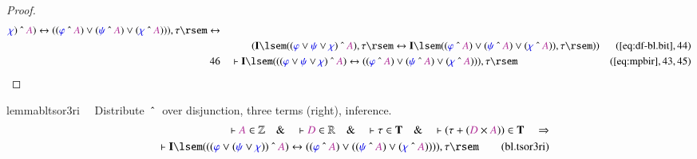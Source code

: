 \begin{proof}
\begin{align}
      \mw{\chi} ) ~\string^~ \mc{A} ) \leftrightarrow ( (
      \mw{\varphi} ~\string^~ \mc{A} ) \vee ( \mw{\psi}
      ~\string^~ \mc{A} ) \vee ( \mw{\chi} ~\string^~
      \mc{A} ) ) ) , \tau \rsem \leftrightarrow \notag \\ & & & \qquad
      (
      \mathbf{I} \lsem ( ( \mw{\varphi} \vee \mw{\psi} \vee
      \mw{\chi} ) ~\string^~ \mc{A} ) , \tau \rsem
      \leftrightarrow \mathbf{I} \lsem ( ( \mw{\varphi}
      ~\string^~ \mc{A} ) \vee ( \mw{\psi} ~\string^~
      \mc{A} ) \vee ( \mw{\chi} ~\string^~ \mc{A} ) ) ,
      \tau \rsem ) )&(\mbox{\ref{eq:df-bl.bit}},44)\notag
  \\ 46 &&  & \vdash \mathbf{I} \lsem ( ( ( \mw{\varphi} \vee \mw{\psi} \vee
      \mw{\chi} ) ~\string^~ \mc{A} ) \leftrightarrow ( (
      \mw{\varphi} ~\string^~ \mc{A} ) \vee ( \mw{\psi}
      ~\string^~ \mc{A} ) \vee ( \mw{\chi} ~\string^~
      \mc{A} ) ) ) , \tau
      \rsem&(\mbox{\ref{eq:mpbir}},43,45)\notag
\end{align}
\end{proof}

\begin{restatable}{lemma}{bltsor3ri}~~ Distribute $~\string^~$ over
disjunction, three terms (right), inference.
\begin{align}
\vdash \mc{A} \in \mathbb{Z}\quad\&\quad \vdash \mc{D} \in
    \mathbb{R}\quad\&\quad \vdash \tau \in \mathbf{T}\quad\&\quad \vdash ( \tau
    + ( \mc{D} \times \mc{A} ) ) \in \mathbf{T}\quad\Rightarrow \notag \\ %
     \quad \vdash
    \mathbf{I} \lsem ( ( ( \mw{\varphi} \vee ( \mw{\psi} \vee \mw{\chi} ) )
    ~\string^~ \mc{A} ) \leftrightarrow ( ( \mw{\varphi} ~\string^~ \mc{A} )
    \vee ( ( \mw{\psi} ~\string^~ \mc{A} ) \vee ( \mw{\chi} ~\string^~ \mc{A} )
    ) ) ) , \tau \rsem\label{eq:bl.tsor3ri}\tag{bl.tsor3ri}
\end{align}
\end{restatable}

